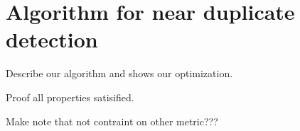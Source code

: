 \section{Algorithm for near duplicate detection}
\label{section:luciv}

Describe our algorithm and shows our optimization.

Proof all properties satisified.

Make note that not contraint on other metric???